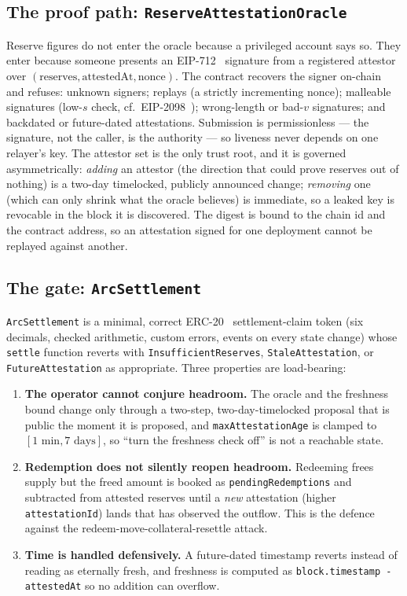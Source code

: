 \documentclass[11pt]{article}
\begin{document}
\subsection{The proof path: \texttt{ReserveAttestationOracle}}
Reserve figures do not enter the oracle because a privileged account says so. They enter
because someone presents an EIP-712~\cite{eip712} signature from a registered attestor
over $(\text{reserves}, \text{attestedAt}, \text{nonce})$. The contract recovers the
signer on-chain and refuses: unknown signers; replays (a strictly incrementing nonce);
malleable signatures (low-$s$ check, cf.\ EIP-2098~\cite{eip2098}); wrong-length or
bad-$v$ signatures; and backdated or future-dated attestations. Submission is
permissionless --- the signature, not the caller, is the authority --- so liveness never
depends on one relayer's key. The attestor set is the only trust root, and it is governed
asymmetrically: \emph{adding} an attestor (the direction that could prove reserves out of
nothing) is a two-day timelocked, publicly announced change; \emph{removing} one (which
can only shrink what the oracle believes) is immediate, so a leaked key is revocable in
the block it is discovered. The digest is bound to the chain id and the contract address,
so an attestation signed for one deployment cannot be replayed against another.

\subsection{The gate: \texttt{ArcSettlement}}
\texttt{ArcSettlement} is a minimal, correct ERC-20~\cite{eip20} settlement-claim token
(six decimals, checked arithmetic, custom errors, events on every state change) whose
\texttt{settle} function reverts with \texttt{InsufficientReserves},
\texttt{StaleAttestation}, or \texttt{FutureAttestation} as appropriate. Three properties
are load-bearing:

\begin{enumerate}[leftmargin=1.4em]
\item \textbf{The operator cannot conjure headroom.} The oracle and the freshness bound
change only through a two-step, two-day-timelocked proposal that is public the moment it
is proposed, and \texttt{maxAttestationAge} is clamped to $[1\text{ min}, 7\text{ days}]$,
so ``turn the freshness check off'' is not a reachable state.
\item \textbf{Redemption does not silently reopen headroom.} Redeeming frees supply but
the freed amount is booked as \texttt{pendingRedemptions} and subtracted from attested
reserves until a \emph{new} attestation (higher \texttt{attestationId}) lands that has
observed the outflow. This is the defence against the redeem-move-collateral-resettle
attack.
\item \textbf{Time is handled defensively.} A future-dated timestamp reverts instead of
reading as eternally fresh, and freshness is computed as
\texttt{block.timestamp - attestedAt} so no addition can overflow.
\end{enumerate}
\end{document}
